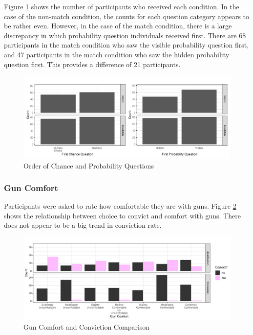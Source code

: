 \documentclass[print]{nuthesis}
\begin{document}
Figure \ref{fig:chanceorder} shows the number of participants who received each condition.
In the case of the non-match condition, the counts for each question category appears to be rather even.
However, in the case of the match condition, there is a large discrepancy in which probability question individuals received first.
There are 68 participants in the match condition who saw the visible probability question first, and 47 participants in the match condition who saw the hidden probability question first.
This provides a difference of 21 participants.

\begin{figure}

{\centering \includegraphics[width=\linewidth]{thesis_files/figure-latex/chanceorder-1} 

}

\caption{Order of Chance and Probability Questions}\label{fig:chanceorder}
\end{figure}

\hypertarget{gun-comfort}{%
\subsubsection{Gun Comfort}\label{gun-comfort}}

Participants were asked to rate how comfortable they are with guns.
Figure \ref{fig:convictscomfort} shows the relationship between choice to convict and comfort with guns.
There does not appear to be a big trend in conviction rate.

\begin{figure}

{\centering \includegraphics[width=\linewidth]{thesis_files/figure-latex/convictscomfort-1} 

}

\caption{Gun Comfort and Conviction Comparison}\label{fig:convictscomfort}
\end{figure}
\end{document}
